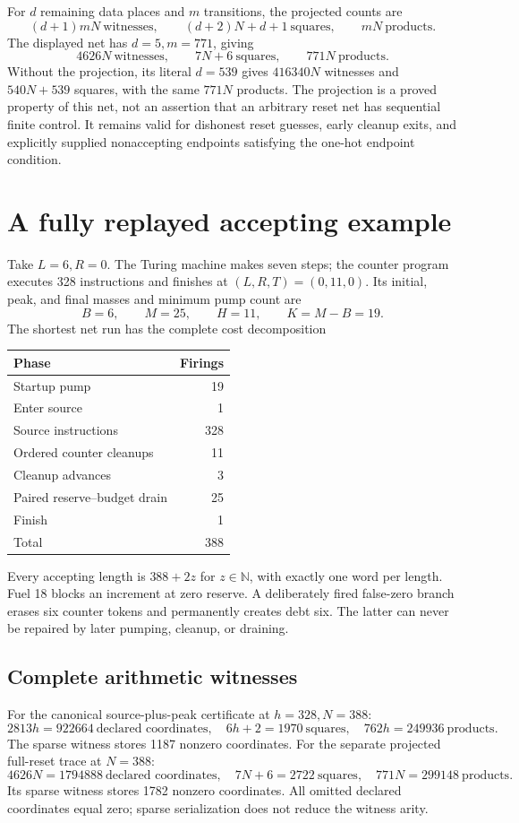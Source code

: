 \documentclass[11pt,letterpaper]{article}
\theoremstyle{definition}
\theoremstyle{remark}
\newcommand{\N}{\mathbb N}
\begin{document}
For $d$ remaining data places and $m$ transitions, the projected counts are
\[
 (d+1)mN\ \text{witnesses},\qquad (d+2)N+d+1\ \text{squares},\qquad mN\ \text{products}.
\]
The displayed net has $d=5,m=771$, giving
\[
 4626N\ \text{witnesses},\qquad 7N+6\ \text{squares},\qquad 771N\ \text{products}.
\]
Without the projection, its literal $d=539$ gives $416340N$ witnesses and $540N+539$ squares, with the same $771N$ products. The projection is a proved property of this net, not an assertion that an arbitrary reset net has sequential finite control. It remains valid for dishonest reset guesses, early cleanup exits, and explicitly supplied nonaccepting endpoints satisfying the one-hot endpoint condition.

\section{A fully replayed accepting example}
\label{qoc:rn:sec:example}
Take $L=6,R=0$. The Turing machine makes seven steps; the counter program executes 328 instructions and finishes at $(L,R,T)=(0,11,0)$. Its initial, peak, and final masses and minimum pump count are
\[
 B=6,\qquad M=25,\qquad H=11,\qquad K=M-B=19.
\]
The shortest net run has the complete cost decomposition
\begin{center}
\begin{tabular}{lr}
\toprule
Phase & Firings\\\midrule
Startup pump & 19\\
Enter source & 1\\
Source instructions & 328\\
Ordered counter cleanups & 11\\
Cleanup advances & 3\\
Paired reserve--budget drain & 25\\
Finish & 1\\\midrule
Total & 388\\\bottomrule
\end{tabular}
\end{center}
Every accepting length is $388+2z$ for $z\in\N$, with exactly one word per length. Fuel 18 blocks an increment at zero reserve. A deliberately fired false-zero branch erases six counter tokens and permanently creates debt six. The latter can never be repaired by later pumping, cleanup, or draining.

\subsection{Complete arithmetic witnesses}
For the canonical source-plus-peak certificate at $h=328,N=388$:
\[
 2813h=922664\ \text{declared coordinates},\quad
 6h+2=1970\ \text{squares},\quad 762h=249936\ \text{products}.
\]
The sparse witness stores 1187 nonzero coordinates. For the separate projected full-reset trace at $N=388$:
\[
 4626N=1794888\ \text{declared coordinates},\quad
 7N+6=2722\ \text{squares},\quad771N=299148\ \text{products}.
\]
Its sparse witness stores 1782 nonzero coordinates. All omitted declared coordinates equal zero; sparse serialization does not reduce the witness arity.
\end{document}
